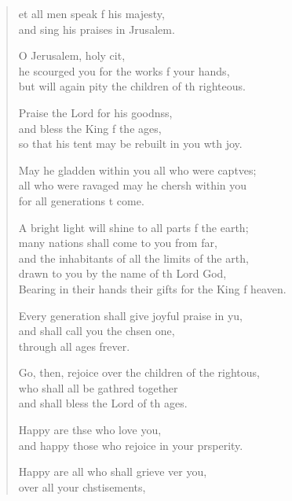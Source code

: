 \settowidth{\versewidth}{Bearing in their hands their gifts for the King of heaven.}
\begin{verse}%
  \begin{patverse}
et all men speak f his majesty,\Med\\
and sing his praises in Jrusalem.

O Jerusalem, holy cit,\Flex\\
he scourged you for the works f your hands,\Med\\
but will again pity the children of th righteous.

Praise the Lord for his goodnss,\Flex\\
and bless the King f the ages,\Med\\
so that his tent may be rebuilt in you w\pointup{\i}th joy.

May he gladden within you all who were capt\pointup{\i}ves;\Flex\\
all who were ravaged may he cher\pointup{\i}sh within you\Med\\
for all generations t come.

A bright light will shine to all parts f the earth;\Med\\
many nations shall come to you from far,\\
and the inhabitants of all the limits of the arth,\Flex\\
drawn to you by the name of th Lord God,\Med\\
Bearing in their hands their gifts for the King f heaven.

Every generation shall give joyful praise in yu,\Flex\\
and shall call you the chsen one,\Med\\
through all ages frever.

Go, then, rejoice over the children of the rightous,\Flex\\
who shall all be gathred together\Med\\
and shall bless the Lord of th ages.

Happy are thse who love you,\Med\\
and happy those who rejoice in your prsperity.

Happy are all who shall grieve ver you,\Med\\
over all your chstisements,


\end{patverse}
\end{verse}
